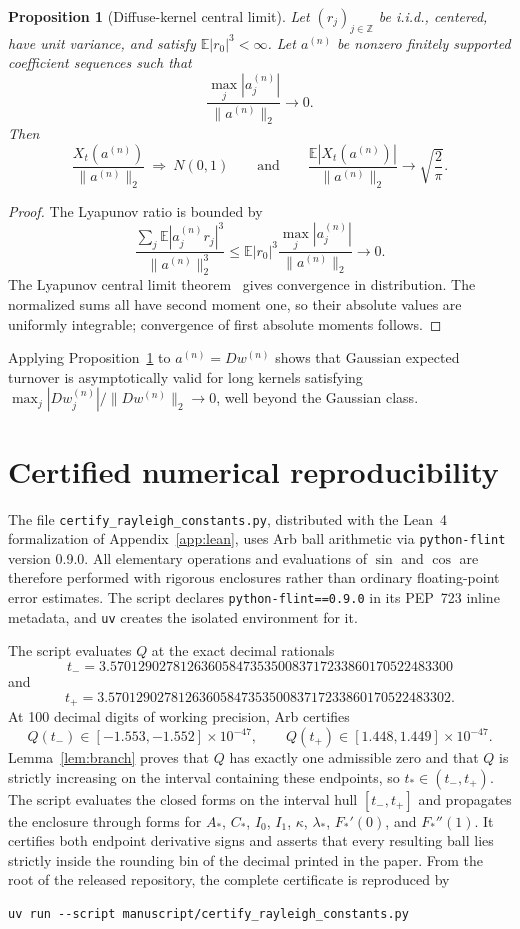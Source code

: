 \documentclass[11pt]{article}
\newtheorem{proposition}[theorem]{Proposition}
\theoremstyle{definition}
\theoremstyle{remark}
\begin{document}
\begin{proposition}[Diffuse-kernel central limit]\label{prop:diffuse-clt}
Let $(r_j)_{j\in\mathbb Z}$ be i.i.d., centered, have unit variance, and satisfy
$\mathbb E|r_0|^3<\infty$. Let $a^{(n)}$ be nonzero finitely supported
coefficient sequences such that
\[
 \frac{\max_j|a_j^{(n)}|}{\|a^{(n)}\|_2}\longrightarrow0.
\]
Then
\[
 \frac{X_t(a^{(n)})}{\|a^{(n)}\|_2}\ \Longrightarrow\ N(0,1)
 \qquad\text{and}\qquad
 \frac{\mathbb E|X_t(a^{(n)})|}{\|a^{(n)}\|_2}
 \longrightarrow\sqrt{\frac2\pi}.
\]
\end{proposition}
\begin{proof}
The Lyapunov ratio is bounded by
\[
 \frac{\sum_j\mathbb E|a_j^{(n)}r_j|^3}{\|a^{(n)}\|_2^3}
 \leq\mathbb E|r_0|^3
 \frac{\max_j|a_j^{(n)}|}{\|a^{(n)}\|_2}
 \longrightarrow0.
\]
The Lyapunov central limit theorem~\cite{Billingsley} gives convergence in distribution. The
normalized sums all have second moment one, so their absolute values are
uniformly integrable; convergence of first absolute moments follows.
\end{proof}

Applying Proposition~\ref{prop:diffuse-clt} to $a^{(n)}=Dw^{(n)}$ shows that
Gaussian expected turnover is asymptotically valid for long kernels satisfying
$\max_j|Dw_j^{(n)}|/\|Dw^{(n)}\|_2\to0$, well beyond the Gaussian class.

\section{Certified numerical reproducibility}\label{app:certificate}
The file \texttt{certify\_rayleigh\_constants.py}, distributed with the
Lean~4 formalization of Appendix~\ref{app:lean}, uses Arb ball arithmetic via
\texttt{python-flint} version 0.9.0. All
elementary operations and evaluations of $\sin$ and $\cos$ are therefore
performed with rigorous enclosures rather than ordinary floating-point error
estimates. The script declares \texttt{python-flint==0.9.0} in its PEP~723 inline
metadata, and \texttt{uv} creates the isolated environment for it.

The script evaluates $Q$ at the exact decimal rationals
\[
 t_-=3.5701290278126360584735350083717233860170522483300
\]
and
\[
 t_+=3.5701290278126360584735350083717233860170522483302.
\]
At 100 decimal digits of working precision, Arb certifies
\[
 Q(t_-)\in[-1.553,-1.552]\times10^{-47},
 \qquad
 Q(t_+)\in[1.448,1.449]\times10^{-47}.
\]
Lemma~\ref{lem:branch} proves that $Q$ has exactly one admissible zero and that
$Q$ is strictly increasing on the interval containing these endpoints, so
$t_*\in(t_-,t_+)$. The script evaluates the closed forms on the interval hull
$[t_-,t_+]$ and propagates the enclosure through
forms for $A_*$, $C_*$, $I_0$, $I_1$, $\kappa$, $\lambda_*$,
$F_*'(0)$, and $F_*''(1)$. It certifies both endpoint derivative signs and
asserts that every resulting ball lies strictly inside the rounding bin of the
decimal printed in the paper. From the root of the released repository, the complete
certificate is reproduced by
\begin{verbatim}
uv run --script manuscript/certify_rayleigh_constants.py
\end{verbatim}
\end{document}
